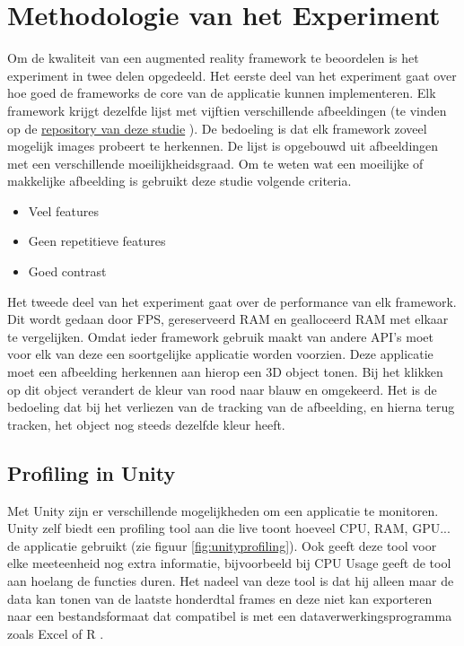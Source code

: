 
\chapter{Methodologie van het Experiment}
\label{ch:methodologie}

Om de kwaliteit van een augmented reality framework te beoordelen is het experiment in twee delen opgedeeld. Het eerste deel van het experiment gaat over hoe goed de frameworks de core van de applicatie kunnen implementeren. Elk framework krijgt dezelfde lijst met vijftien verschillende afbeeldingen (te vinden op de \href{https://github.com/MatthiasDeFre/bachelorproef-hogent-2019}{repository van deze studie} \autocite{GITHUBMDF}). De bedoeling is dat elk framework zoveel mogelijk images probeert te herkennen. De lijst is opgebouwd uit afbeeldingen met een verschillende moeilijkheidsgraad. Om te weten wat een moeilijke of makkelijke afbeelding is gebruikt deze studie volgende criteria.

\begin{itemize}
    \item Veel features
    \item Geen repetitieve features
    \item Goed contrast
\end{itemize} 


Het tweede deel van het experiment gaat over de performance van elk framework. Dit wordt gedaan door FPS, gereserveerd RAM en gealloceerd RAM met elkaar te vergelijken. Omdat ieder framework gebruik maakt van andere API's moet voor elk van deze een soortgelijke applicatie worden voorzien. Deze applicatie moet een afbeelding herkennen aan hierop een 3D object tonen. Bij het klikken op dit object verandert de kleur van rood naar blauw en omgekeerd. Het is de bedoeling dat bij het verliezen van de tracking van de afbeelding, en hierna terug tracken, het object nog steeds dezelfde kleur heeft.

\section{Profiling in Unity}
Met Unity zijn er verschillende mogelijkheden om een applicatie te monitoren. Unity zelf biedt een profiling tool aan die live toont hoeveel CPU, RAM, GPU... de applicatie gebruikt (zie figuur \ref{fig:unityprofiling}). Ook geeft deze tool voor elke meeteenheid nog extra informatie, bijvoorbeeld bij CPU Usage geeft de tool aan hoelang de functies duren. Het nadeel van deze tool is dat hij alleen maar de data kan tonen van de laatste honderdtal frames en deze niet kan exporteren naar een bestandsformaat dat compatibel is met een dataverwerkingsprogramma zoals Excel of R \autocite{UnityProfiling}.

